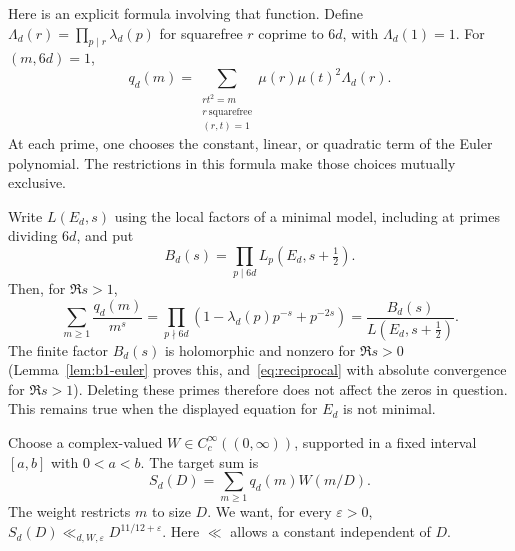 \documentclass[11pt]{article}
\numberwithin{equation}{section}
\begin{document}
Here is an explicit formula involving that function. Define
$\Lambda_d(r)=\prod_{p\mid r}\lambda_d(p)$ for squarefree $r$ coprime
to $6d$, with $\Lambda_d(1)=1$. For $(m,6d)=1$,
\begin{equation}\label{eq:integer-convolution}
 \boxed{\quad
 q_d(m)=\sum_{\substack{rt^2=m\\r\ \mathrm{squarefree}\\(r,t)=1}}
       \mu(r)\mu(t)^2\Lambda_d(r).
 \quad}
\end{equation}
At each prime, one chooses the constant, linear, or quadratic term of
the Euler polynomial. The restrictions in this formula make those choices
mutually exclusive.

Write $L(E_d,s)$ using the local factors of a minimal model, including at
primes dividing $6d$, and put
\begin{equation}\label{eq:d004}
 B_d(s)=\prod_{p\mid6d}L_p(E_d,s+\tfrac12).
\end{equation}
Then, for $\Re s>1$,
\begin{equation}\label{eq:reciprocal}
 \sum_{m\ge1}\frac{q_d(m)}{m^s}
 =\prod_{p\nmid6d}(1-\lambda_d(p)p^{-s}+p^{-2s})
 =\frac{B_d(s)}{L(E_d,s+\tfrac12)}.
\end{equation}
The finite factor $B_d(s)$ is holomorphic and nonzero for $\Re s>0$
(Lemma~\ref{lem:b1-euler} proves this, and~\eqref{eq:reciprocal} with absolute convergence for $\Re s>1$).
Deleting these primes therefore does not affect the zeros in question.
This remains true when the displayed equation for $E_d$ is not minimal.

Choose a complex-valued $W\in C_c^\infty((0,\infty))$, supported in a fixed
interval $[a,b]$ with $0<a<b$. The target sum is
\begin{equation}\label{eq:target}
 S_d(D)=\sum_{m\ge1}q_d(m)W(m/D).
\end{equation}
The weight restricts $m$ to size $D$. We want, for every $\varepsilon>0$,
$S_d(D)\ll_{d,W,\varepsilon}D^{11/12+\varepsilon}$.
Here $\ll$ allows a constant independent of $D$.
\end{document}
